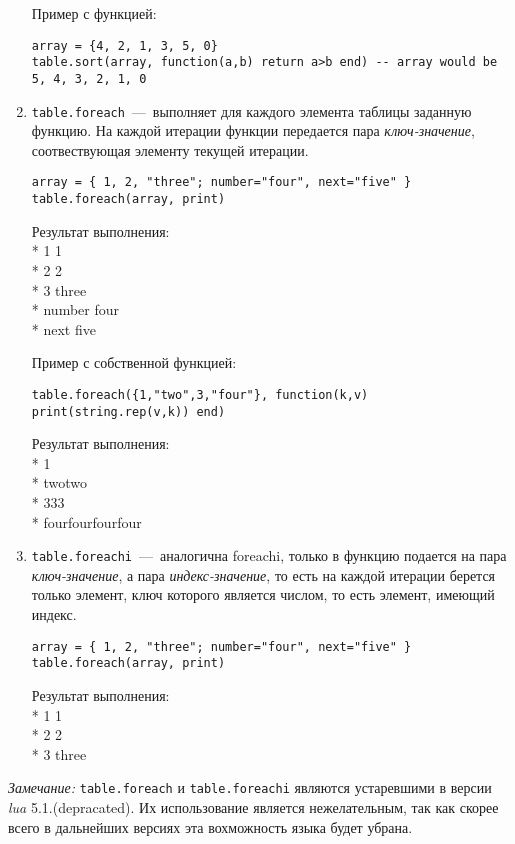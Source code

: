 \begin{enumerate}
Пример с функцией:
\begin{lstlisting}
array = {4, 2, 1, 3, 5, 0}
table.sort(array, function(a,b) return a>b end) -- array would be 5, 4, 3, 2, 1, 0
\end{lstlisting}
	
	\item \lstinline{table.foreach}~---~выполняет для каждого элемента таблицы заданную функцию. На каждой итерации функции передается пара \textit{ключ-значение}, соотвествующая элементу текущей итерации.
	
\begin{lstlisting}
array = { 1, 2, "three"; number="four", next="five" }
table.foreach(array, print)   
\end{lstlisting}

Результат выполнения:
\\* 1  		 1		
\\* 2   	 2
\\* 3   	 three
\\* number   four
\\* next     five

Пример с собственной функцией:
\begin{lstlisting}
table.foreach({1,"two",3,"four"}, function(k,v) print(string.rep(v,k)) end)   
\end{lstlisting}

Результат выполнения:
\\* 1
\\* twotwo
\\* 333
\\* fourfourfourfour

	\item \lstinline{table.foreachi}~---~аналогична foreachi, только в функцию подается на пара \textit{ключ-значение}, а пара \textit{индекс-значение}, то есть на каждой итерации берется только элемент, ключ которого является числом, то есть элемент, имеющий индекс. 
	

\begin{lstlisting}
array = { 1, 2, "three"; number="four", next="five" }
table.foreach(array, print)
\end{lstlisting}

Результат выполнения:
\\* 1  		 1
\\* 2   	 2
\\* 3   	 three

\end{enumerate}

\emph{Замечание:}
\lstinline{table.foreach} и \lstinline{table.foreachi} являются устаревшими в версии \emph{lua} 5.1.(depracated). Их использование является нежелательным, так как скорее всего в дальнейших версиях эта вохможность языка будет убрана. 


